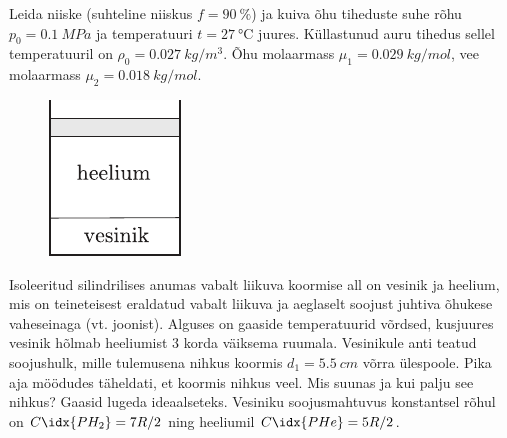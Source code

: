 \documentclass[10pt]{article}
\begin{document}
{%

Leida niiske (suhteline niiskus $f = \SI{90}{\%}$) ja kuiva õhu tiheduste suhe rõhu $p_0 = \SI{0,1}{MPa}$ ja temperatuuri $t = \SI{27}{\degreeCelsius}$ juures. Küllastunud auru tihedus sellel temperatuuril on $\rho_0 = \SI{0,027}{kg/m^3}$. Õhu molaarmass $\mu_1 = \SI{0,029}{kg/mol}$, vee molaarmass $\mu_2 = \SI{0,018}{kg/mol}$.
\probend
\bigskip


\begin{figure}
	\begin{center}
		\vspace{-20pt}
		\includegraphics[width=0.95\linewidth]{2007-v3g-06-yl}
	\end{center}
\end{figure}
Isoleeritud silindrilises anumas vabalt liikuva koormise all on vesinik ja heelium, mis on teineteisest eraldatud vabalt liikuva ja aeglaselt soojust juhtiva õhukese vaheseinaga (vt. joonist). Alguses on gaaside temperatuurid võrdsed, kusjuures vesinik hõlmab heeliumist 3 korda väiksema ruumala. Vesinikule anti teatud soojushulk, mille tulemusena nihkus koormis $d_1 = \SI{5,5}{cm}$ võrra ülespoole. Pika aja möödudes täheldati, et koormis nihkus veel. Mis suunas ja kui palju see nihkus? Gaasid lugeda ideaalseteks. Vesiniku soojusmahtuvus konstantsel rõhul on $C\idx{PH_2} = 7R/2$ ning heeliumil $C\idx{PHe} = 5R/2$.
\probend
\bigskip

}
\end{document}
